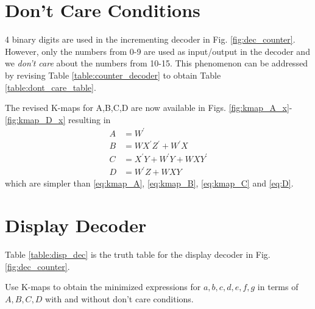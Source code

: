 \documentclass[journal,12pt,twocolumn]{IEEEtran}
\begin{document}
\section{Don't Care Conditions}
4 binary digits are used in the incrementing decoder in Fig. \ref{fig:dec_counter}.  However, only the numbers from 0-9 are used as input/output
in the decoder and we {\em don't care} about the numbers from 10-15.  This phenomenon can be addressed by revising Table \ref{table:counter_decoder} to obtain
Table \ref{table:dont_care_table}.

The revised K-maps for A,B,C,D are now available in Figs. \ref{fig:kmap_A_x}-\ref{fig:kmap_D_x} resulting in 
\begin{align}
A &= {W}^{\prime}
\\
B &= WX^{\prime}Z^{\prime} + W^{\prime}X
\\
C &= {X}^{\prime}{Y} + {W}^{\prime}{Y} + {W}{X}{Y}^{\prime}
\\
D & = {W}^{\prime}{Z} + {W}{X}{Y}
\end{align}
which are simpler than \eqref{eq:kmap_A}, \eqref{eq:kmap_B}, \eqref{eq:kmap_C} and \eqref{eq:D}. 
\section{Display Decoder}
Table \ref{table:disp_dec} is the truth table for the display decoder in Fig. \ref{fig:dec_counter}.  
\begin{problem}
Use K-maps to obtain the minimized expressions for $a,b,c,d,e,f,g$ in terms of $A,B,C,D$ with and without don't care conditions.
\end{problem}

\end{document}
